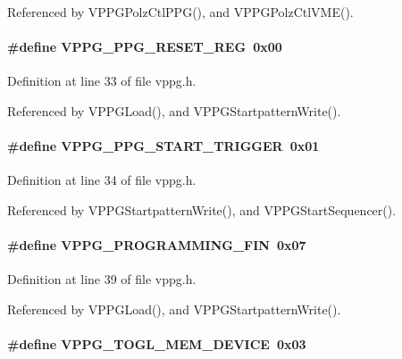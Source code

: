 Referenced by VPPGPolzCtlPPG(), and VPPGPolzCtlVME().
\paragraph[{VPPG\_\-PPG\_\-RESET\_\-REG}]{\setlength{\rightskip}{0pt plus 5cm}\#define VPPG\_\-PPG\_\-RESET\_\-REG~0x00}\hfill\label{vppg_8h_a622dc34ef12b9046cae79b58fb985869}


Definition at line 33 of file vppg.h.

Referenced by VPPGLoad(), and VPPGStartpatternWrite().
\paragraph[{VPPG\_\-PPG\_\-START\_\-TRIGGER}]{\setlength{\rightskip}{0pt plus 5cm}\#define VPPG\_\-PPG\_\-START\_\-TRIGGER~0x01}\hfill\label{vppg_8h_a6e6423bc78506a47e1942bc36db9be5e}


Definition at line 34 of file vppg.h.

Referenced by VPPGStartpatternWrite(), and VPPGStartSequencer().
\paragraph[{VPPG\_\-PROGRAMMING\_\-FIN}]{\setlength{\rightskip}{0pt plus 5cm}\#define VPPG\_\-PROGRAMMING\_\-FIN~0x07}\hfill\label{vppg_8h_aaef2e21b06ae4b9689e4c80ee4588ff2}


Definition at line 39 of file vppg.h.

Referenced by VPPGLoad(), and VPPGStartpatternWrite().
\paragraph[{VPPG\_\-TOGL\_\-MEM\_\-DEVICE}]{\setlength{\rightskip}{0pt plus 5cm}\#define VPPG\_\-TOGL\_\-MEM\_\-DEVICE~0x03}\hfill\label{vppg_8h_a3893d9588ab14bcdc2ec5f6510875671}


